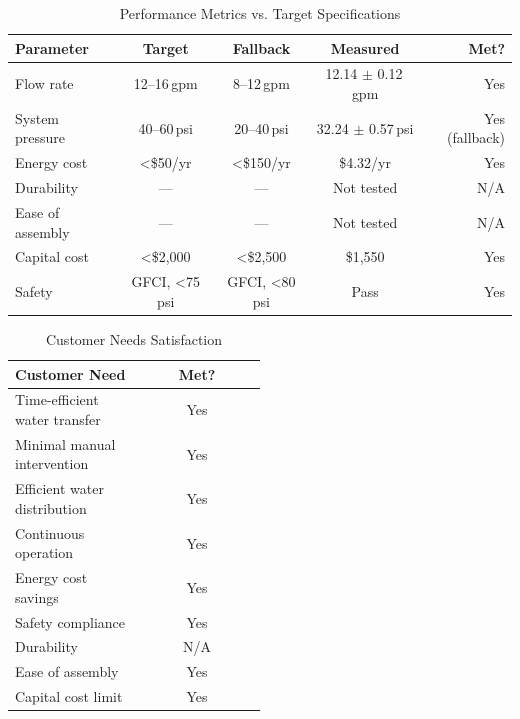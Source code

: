 \documentclass[12pt]{report}
\begin{document}
\begin{table}[H]
  \centering
  \caption{Performance Metrics vs. Target Specifications}
  \label{tab:performance}
  \begin{tabular}{lcccr}
    \toprule
    Parameter & Target & Fallback & Measured & Met? \\
    \midrule
    Flow rate      & 12--16\,gpm & 8--12\,gpm    & 12.14 $\pm$ 0.12\,gpm & Yes \\
    System pressure & 40--60\,psi & 20--40\,psi  & 32.24 $\pm$ 0.57\,psi & Yes (fallback) \\
    Energy cost    & \textless \$50/yr    & \textless \$150/yr     & \$4.32/yr              & Yes \\
    Durability     & —           & —             & Not tested             & N/A \\
    Ease of assembly & —         & —             & Not tested             & N/A \\
    Capital cost   & \textless \$2{,}000 & \textless \$2{,}500     & \$1,550                & Yes \\
    Safety         & GFCI, \textless 75 psi & GFCI, \textless 80 psi & Pass           & Yes \\
    \bottomrule
  \end{tabular}
\end{table}

\begin{table}[H]
  \centering
  \caption{Customer Needs Satisfaction}
  \label{tab:needs}
  \begin{tabular}{p{0.5\linewidth}c}
    \toprule
    \textbf{Customer Need} & \textbf{Met?} \\
    \midrule
    Time-efficient water transfer   & Yes \\
    Minimal manual intervention     & Yes \\
    Efficient water distribution    & Yes \\
    Continuous operation            & Yes \\
    Energy cost savings             & Yes \\
    Safety compliance               & Yes \\
    Durability                      & N/A \\
    Ease of assembly                & Yes \\
    Capital cost limit              & Yes \\
    \bottomrule
  \end{tabular}
\end{table}
\end{document}
